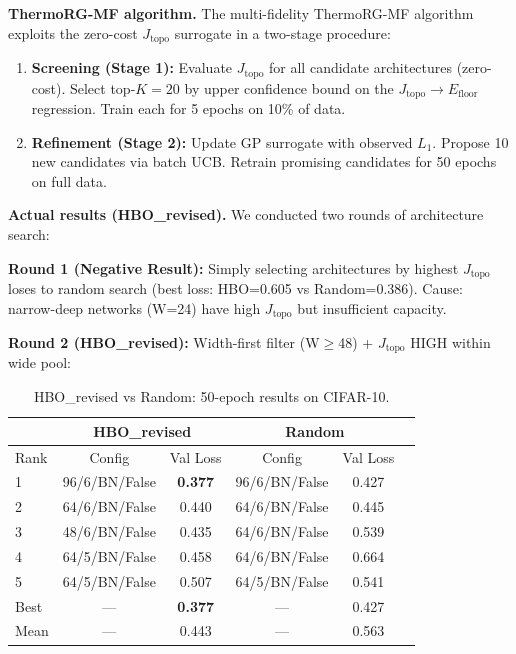 \documentclass[11pt, a4paper]{article}
\theoremstyle{definition}
\begin{document}
\textbf{ThermoRG-MF algorithm.} The multi-fidelity ThermoRG-MF algorithm exploits the zero-cost $J_{\mathrm{topo}}$ surrogate in a two-stage procedure:
\begin{enumerate}
    \item \textbf{Screening (Stage 1):} Evaluate $J_{\mathrm{topo}}$ for all candidate architectures (zero-cost). Select top-$K=20$ by upper confidence bound on the $J_{\mathrm{topo}} \to E_{\mathrm{floor}}$ regression. Train each for 5 epochs on 10\% of data.
    \item \textbf{Refinement (Stage 2):} Update GP surrogate with observed $L_1$. Propose 10 new candidates via batch UCB. Retrain promising candidates for 50 epochs on full data.
\end{enumerate}

\textbf{Actual results (HBO\_revised).} We conducted two rounds of architecture search:

\textbf{Round 1 (Negative Result):} Simply selecting architectures by highest $J_{\mathrm{topo}}$ loses to random search (best loss: HBO=0.605 vs Random=0.386). Cause: narrow-deep networks (W=24) have high $J_{\mathrm{topo}}$ but insufficient capacity.

\textbf{Round 2 (HBO\_revised):} Width-first filter (W$\geq$48) + $J_{\mathrm{topo}}$ HIGH within wide pool:

\begin{table}[h]
\centering
\begin{tabular}{lccccc}
\hline
 & \multicolumn{2}{c}{HBO\_revised} & \multicolumn{2}{c}{Random} \\
\hline
Rank & Config & Val Loss & Config & Val Loss \\
\hline
1 & 96/6/BN/False & \textbf{0.377} & 96/6/BN/False & 0.427 \\
2 & 64/6/BN/False & 0.440 & 64/6/BN/False & 0.445 \\
3 & 48/6/BN/False & 0.435 & 64/6/BN/False & 0.539 \\
4 & 64/5/BN/False & 0.458 & 64/6/BN/False & 0.664 \\
5 & 64/5/BN/False & 0.507 & 64/5/BN/False & 0.541 \\
\hline
Best & — & \textbf{0.377} & — & 0.427 \\
Mean & — & 0.443 & — & 0.563 \\
\hline
\end{tabular}
\caption{HBO\_revised vs Random: 50-epoch results on CIFAR-10.}
\label{tab:hbo-revised}
\end{table}
\end{document}
